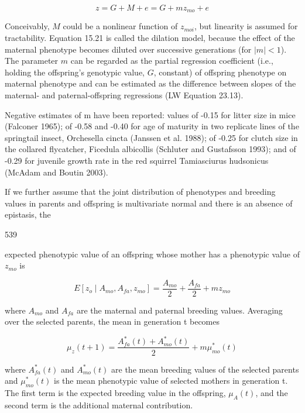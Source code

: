 \documentclass{article}
\begin{document}
\begin{equation}
z=G+M+e=G+m z_{m o}+e
\tag{15.21}
\label{eq:15_21}
\end{equation}

Conceivably, $M$ could be a nonlinear function of $z_{moi}$, but linearity is assumed for tractability. Equation 15.21 is called the dilation model, because the effect of the maternal phenotype becomes diluted over successive generations (for $|m| < 1$). The parameter $m$ can be regarded as the partial regression coefficient (i.e., holding the offspring's genotypic value, $G$, constant) of offspring phenotype on maternal phenotype and can be estimated as the difference between slopes of the maternal- and paternal-offspring regressions (LW Equation 23.13).

Negative estimates of m have been reported: values of -0.15 for litter size in mice (Falconer 1965); of -0.58 and -0.40 for age of maturity in two replicate lines of the springtail insect, Orchesella cincta (Janssen et al. 1988); of -0.25 for clutch size in the collared flycatcher, Ficedula albicollis (Schluter and Gustafsson 1993); and of -0.29 for juvenile growth rate in the red squirrel Tamiasciurus hudsonicus (McAdam and Boutin 2003).

If we further assume that the joint distribution of phenotypes and breeding values in parents and offspring is multivariate normal and there is an absence of epistasis, the

539

expected phenotypic value of an offspring whose mother has a phenotypic value of  $ z_{mo} $ is

\begin{equation}
E\left[z_{o}\mid A_{mo},A_{fa},z_{mo}\right]=\frac{A_{mo}}{2}+\frac{A_{fa}}{2}+m z_{mo}
\tag{15.22a}
\label{eq:15_22a}
\end{equation}

where  $ A_{mo} $ and  $ A_{fa} $ are the maternal and paternal breeding values. Averaging over the selected parents, the mean in generation t becomes

\begin{equation}
\mu_{z}(t+1)=\frac{A_{fa}^{*}(t)+A_{mo}^{*}(t)}{2}+m\mu_{mo}^{*}(t)
\tag{15.22b}
\label{eq:15_22b}
\end{equation}

where  $ A_{fa}^{*}(t) $ and  $ A_{mo}^{*}(t) $ are the mean breeding values of the selected parents and  $ \mu_{mo}^{*}(t) $ is the mean phenotypic value of selected mothers in generation t. The first term is the expected breeding value in the offspring,  $ \mu_{A}(t) $, and the second term is the additional maternal contribution.
\end{document}

